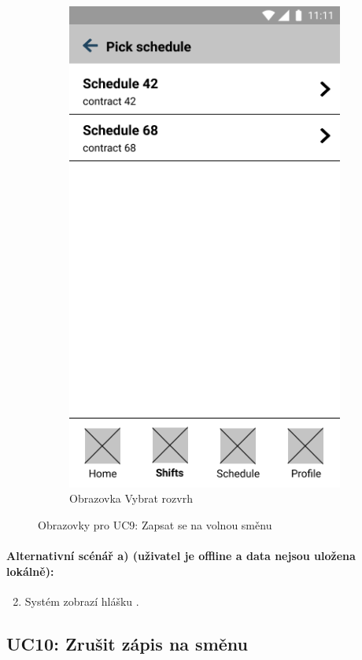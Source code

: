 \documentclass[twoside]{ctuthesis}
\begin{document}
\begin{figure}[h!]
\begin{subfigure}{.45\textwidth}
		\includegraphics[scale=.35]{img/pick-schedule.png}
		\caption{Obrazovka Vybrat rozvrh}
		\label{fig:pick-schedule}
	\end{subfigure}
	\caption{Obrazovky pro UC9: Zapsat se na volnou směnu}
\end{figure}


\paragraph{Alternativní scénář a) (uživatel je offline a data nejsou uložena lokálně):}
\begin{enumerate}[label=\arabic*a]
	\setcounter{enumi}{1}
	\item Systém zobrazí hlášku .
\end{enumerate}


\newpage
\subsection{UC10: Zrušit zápis na směnu}
\end{document}
